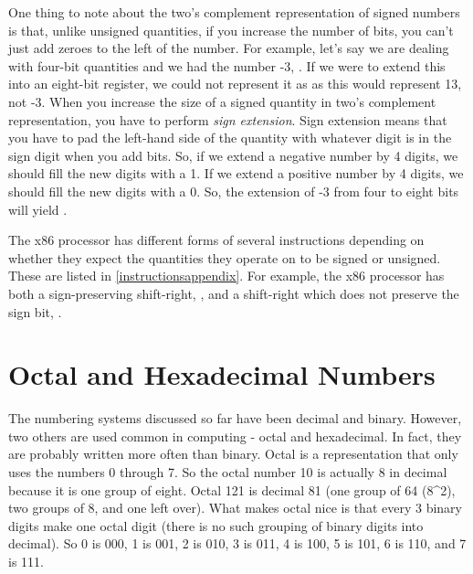 One thing to note about the two's complement representation of signed numbers is that, unlike unsigned quantities, if you increase the number
of bits, you can't just add zeroes to the left of the number.  For example,
let's say we are dealing with four-bit quantities and we had the number
-3, .  If we were to extend this into an eight-bit
register, we could not represent it as  as this
would represent 13, not -3.  When you increase the size of a signed quantity
in two's complement representation, you have to perform 
\emph{sign extension}.  Sign extension means that you have
to pad the left-hand side of the quantity with whatever digit is in the
sign digit when you add bits.  So, if we extend a negative number by 4 digits, 
we should fill the new digits with a 1.  If we extend a positive number by 4 digits, we
should fill the new digits with a 0.  So, the extension of -3 from four to
eight bits will yield .

The x86 processor has different forms of several instructions depending on
whether they expect the quantities they operate on to be signed or unsigned.
These are listed in \autoref{instructionsappendix}.  For example,
the x86 processor has both a sign-preserving shift-right, , and a shift-right which does not preserve the sign bit, .

\section{Octal and Hexadecimal Numbers}
\label{octalhexadecimal}

The numbering systems discussed so far have been decimal and binary.
However, two others are used common in computing - octal and hexadecimal.
In fact, they are probably written more often than binary.  Octal is
a representation that only uses the numbers 0 through 7.  So the octal
number 10 is actually 8 in decimal because it is one group of eight.
Octal 121 is decimal 81 (one group of
64 (8\textasciicircum 2), two groups of 8, and one left over).  What makes octal nice
is that every 3 binary digits make one octal digit (there is no such grouping
of binary digits into decimal).  So 0 is 000, 1 is 001, 2 is 010, 3 is
011, 4 is 100, 5 is 101, 6 is 110, and 7 is 111.

